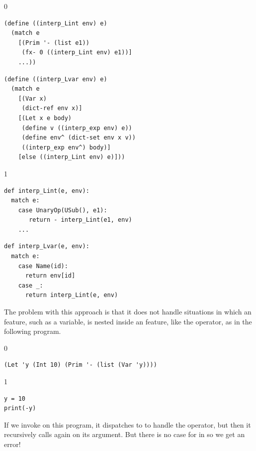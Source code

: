 \documentclass[7x10,nocrop]{TimesAPriori_MIT}%
\def\racketEd{0}
\def\pythonEd{1}
\def\edition{1}
\begin{document}
\begin{center}
{\if\edition\racketEd  
\begin{minipage}{0.45\textwidth}
\begin{lstlisting}
(define ((interp_Lint env) e)
  (match e
    [(Prim '- (list e1))
     (fx- 0 ((interp_Lint env) e1))]
    ...))
\end{lstlisting}
\end{minipage}
\begin{minipage}{0.45\textwidth}
  \begin{lstlisting}
(define ((interp_Lvar env) e)
  (match e
    [(Var x)
     (dict-ref env x)]
    [(Let x e body)
     (define v ((interp_exp env) e))
     (define env^ (dict-set env x v))
     ((interp_exp env^) body)]
    [else ((interp_Lint env) e)]))    
\end{lstlisting}
\end{minipage}
\fi}

{\if\edition\pythonEd
\begin{minipage}{0.45\textwidth}
\begin{lstlisting}
def interp_Lint(e, env):
  match e:
    case UnaryOp(USub(), e1):
       return - interp_Lint(e1, env)
    ...
\end{lstlisting}
\end{minipage}
\begin{minipage}{0.45\textwidth}
\begin{lstlisting}
def interp_Lvar(e, env):
  match e:
    case Name(id):
      return env[id]
    case _:
      return interp_Lint(e, env)
\end{lstlisting}
\end{minipage}
\fi}
\end{center}
The problem with this approach is that it does not handle situations
in which an \LangVar{} feature, such as a variable, is nested inside
an \LangInt{} feature, like the \code{-} operator, as in the following
program.
%
{\if\edition\racketEd
\begin{lstlisting}
(Let 'y (Int 10) (Prim '- (list (Var 'y))))
\end{lstlisting}
\fi}
{\if\edition\pythonEd
  \begin{lstlisting}
y = 10 
print(-y)
\end{lstlisting}
\fi}
%
\noindent If we invoke  on this program, it
dispatches to  to handle the \code{-} operator, but
then it recursively calls  again on its argument.
But there is no case for  in  so we get
an error!
\end{document}
